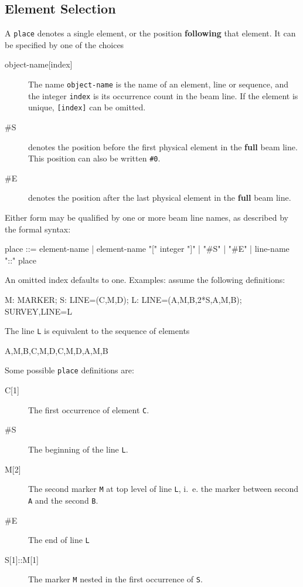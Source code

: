 \subsection{Element Selection}
\label{sec:aplace}
A \texttt{place} denotes a single element, or the position
\textbf{following} that element.
It can be specified by one of the choices
\begin{description}
\item[{object-name[index]}]
The name \verb'object-name' is the name of an element, line or sequence,
and the integer \texttt{index} is its occurrence count in the beam line.
If the element is unique, \texttt{[index]} can be omitted.
\item[{\#S}]
denotes the position before the first physical element in the \textbf{full}
beam line.
This position can also be written \texttt{\#0}.
\item[{\#E}]
denotes the position after the last physical element in the \textbf{full}
beam line.
\end{description}
Either form may be qualified by one or more beam line names,
as described by the formal syntax:
\begin{example}
place ::= element-name |
          element-name "[" integer "]" |
          "#S" |
          "#E" |
          line-name "::" place
\end{example}
An omitted index defaults to one.
\noindent Examples: assume the following definitions:
\begin{example}
M: MARKER;
S: LINE=(C,M,D);
L: LINE=(A,M,B,2*S,A,M,B);
   SURVEY,LINE=L
\end{example}
The line \texttt{L} is equivalent to the sequence of elements
\begin{example}
A,M,B,C,M,D,C,M,D,A,M,B
\end{example}
Some possible \texttt{place} definitions are:
\begin{description}
\item[{C[1]}]
The first occurrence of element \texttt{C}.
\item[\#S]
The beginning of the line \texttt{L}.
\item[{M[2]}]
The second marker \texttt{M} at top level of line \texttt{L},
i.~e. the marker between second \texttt{A} and the second \texttt{B}.
\item[\#E]
The end of line \texttt{L}
\item[{S[1]::M[1]}]
The marker \texttt{M} nested in the first occurrence of \texttt{S}.
\end{description}

